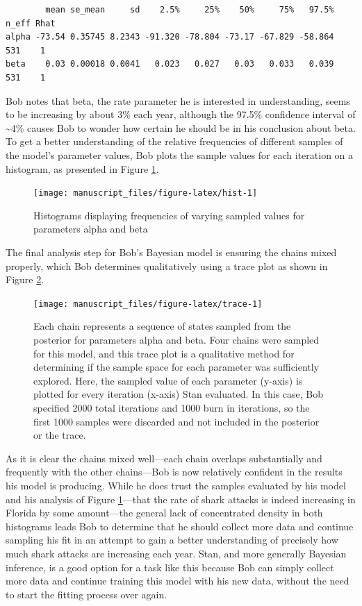 \documentclass[
  12pt,
  twoside]{book}
\theoremstyle{definition}
\theoremstyle{definition}
\theoremstyle{definition}
\theoremstyle{remark}
\begin{document}
\begin{verbatim}
        mean se_mean     sd    2.5%     25%    50%     75%   97.5% n_eff Rhat
alpha -73.54 0.35745 8.2343 -91.320 -78.804 -73.17 -67.829 -58.864   531    1
beta    0.03 0.00018 0.0041   0.023   0.027   0.03   0.033   0.039   531    1
\end{verbatim}

Bob notes that beta, the rate parameter he is interested in understanding, seems to be increasing by about 3\% each year, although the 97.5\% confidence interval of \textasciitilde4\% causes Bob to wonder how certain he should be in his conclusion about beta. To get a better understanding of the relative frequencies of different samples of the model's parameter values, Bob plots the sample values for each iteration on a histogram, as presented in Figure \ref{fig:hist}.

\begin{figure}

{\centering \texttt{[image: manuscript\_files/figure-latex/hist-1]} 

}

\caption{Histograms displaying frequencies of varying sampled values for parameters alpha and beta}\label{fig:hist}
\end{figure}

The final analysis step for Bob's Bayesian model is ensuring the chains mixed properly, which Bob determines qualitatively using a trace plot as shown in Figure \ref{fig:trace}.

\begin{figure}

{\centering \texttt{[image: manuscript\_files/figure-latex/trace-1]} 

}

\caption{Each chain represents a sequence of states sampled from the posterior for parameters alpha and beta. Four chains were sampled for this model, and this trace plot is a qualitative method for determining if the sample space for each parameter was sufficiently explored. Here, the sampled value of each parameter (y-axis) is plotted for every iteration (x-axis) Stan evaluated. In this case, Bob specified 2000 total iterations and 1000 burn in iterations, so the first 1000 samples were discarded and not included in the posterior or the trace.}\label{fig:trace}
\end{figure}

As it is clear the chains mixed well---each chain overlaps substantially and frequently with the other chains---Bob is now relatively confident in the results his model is producing. While he does trust the samples evaluated by his model and his analysis of Figure \ref{fig:hist}---that the rate of shark attacks is indeed increasing in Florida by some amount---the general lack of concentrated density in both histograms leads Bob to determine that he should collect more data and continue sampling his fit in an attempt to gain a better understanding of precisely how much shark attacks are increasing each year.
Stan, and more generally Bayesian inference, is a good option for a task like this because Bob can simply collect more data and continue training this model with his new data, without the need to start the fitting process over again.
\end{document}
